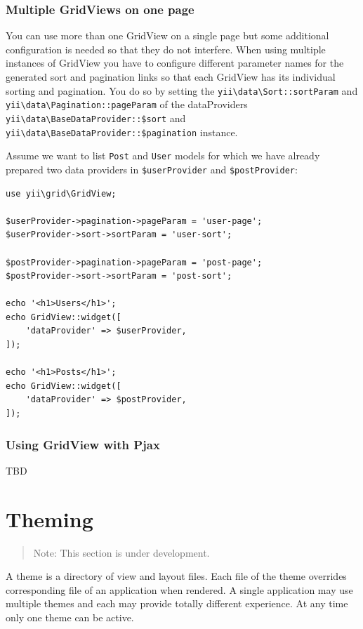 \subsubsection{Multiple GridViews on one page}
You can use more than one GridView on a single page but some additional configuration is needed so that
they do not interfere.
When using multiple instances of GridView you have to configure different parameter names for
the generated sort and pagination links so that each GridView has its individual sorting and pagination.
You do so by setting the \texttt{yii{\allowbreak{}\textbackslash}data{\allowbreak{}\textbackslash}Sort\allowbreak{}::\allowbreak{}sortParam} and \texttt{yii{\allowbreak{}\textbackslash}data{\allowbreak{}\textbackslash}Pagination\allowbreak{}::\allowbreak{}pageParam}
of the dataProviders \texttt{yii{\allowbreak{}\textbackslash}data{\allowbreak{}\textbackslash}BaseDataProvider\allowbreak{}::\allowbreak{}\$sort} and \texttt{yii{\allowbreak{}\textbackslash}data{\allowbreak{}\textbackslash}BaseDataProvider\allowbreak{}::\allowbreak{}\$pagination}
instance.

Assume we want to list \lstinline|Post| and \lstinline|User| models for which we have already prepared two data providers
in \lstinline|$userProvider| and \lstinline|$postProvider|:

\lstset{language=php}\begin{lstlisting}
use yii\grid\GridView;

$userProvider->pagination->pageParam = 'user-page';
$userProvider->sort->sortParam = 'user-sort';

$postProvider->pagination->pageParam = 'post-page';
$postProvider->sort->sortParam = 'post-sort';

echo '<h1>Users</h1>';
echo GridView::widget([
    'dataProvider' => $userProvider,
]);

echo '<h1>Posts</h1>';
echo GridView::widget([
    'dataProvider' => $postProvider,
]);
\end{lstlisting}
\subsubsection{Using GridView with Pjax}
TBD



\label{output-theming.md}\section{Theming}
\begin{quote}Note: This section is under development.

\end{quote}
A theme is a directory of view and layout files. Each file of the theme overrides corresponding file of an application
when rendered. A single application may use multiple themes and each may provide totally different experience. At any
time only one theme can be active.

